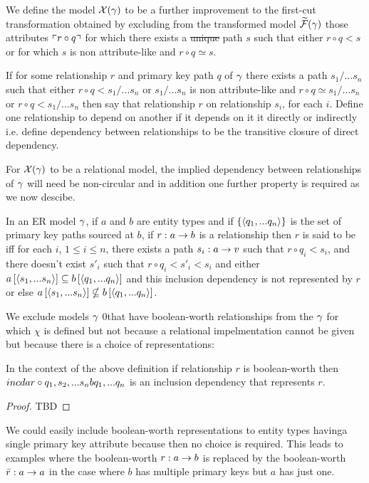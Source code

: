 We define the model $\mathcal{X}(\gamma)$ to be a further improvement to the first-cut transformation obtained by excluding  from  the transformed model $\mathcal{\widetilde{F}}(\gamma)$ those attributes $\left\ulcorner r \circ q\right\urcorner$ for which there exists a \sout{unique}  path $s$ such that  either  $r \circ q < s$ or for which $s$ is non attribute-like and $r \circ q \simeq s$. 

\begin{definition}
If for some relationship $r$ and primary key path $q$ of $\gamma$ there exists a  path $s_1/...s_n$ such that either   $r \circ q < s_1/...s_n$ or $s_1/...s_n$ is non attribute-like and $r \circ q \simeq s_1/...s_n$ or $r \circ q < s_1/...s_n$ then say that relationship $r$  on relationship $s_i$,
for each $i$. Define one relationship to depend on another if it depends on it it directly or indirectly i.e. define dependency between relationships to be the transitive closure of direct dependency.
\end{definition}

For $\mathcal{X}(\gamma)$ to be a relational model, the implied dependency between relationships of $\gamma$ will need be non-circular
and in addition one further property is required as we now descibe.


\begin{definition}
In an  ER model $\gamma$, if $a$ and $b$ are entity types and if $\left\{\langle q_1,...q_n\rangle\right\}$ is the set of primary key paths sourced at $b$, if $r: a \rightarrow b$ is a relationship then $r$ is said to be  
iff for each $i$, $1 \leq i \leq n$, there exists a path $s_i: a \rightarrow v$ such that $r \circ q_i < s_i$,
and there doesn't exist $s'_i$ such that $r \circ q_i < s'_i <s_i$ and  either
$a\left[\langle s_1,...s_n\rangle\right]\subseteq b\left[\langle q_1,...q_n\rangle\right]$ and this inclusion dependency is not represented by
$r$ or else $a\left[\langle s_1,...s_n\rangle\right]\nsubseteq b\left[\langle q_1,...q_n\rangle\right]$.
\end{definition}

We exclude models $\gamma$ 0that have boolean-worth relationships from the $\gamma$ for which $\chi$ is defined but not because a relational impelmentation cannot be given but because there is a choice of representations: 
\begin{lemma}
In the context of the above definition if relationship $r$ is boolean-worth
then $incd{a}{r \circ q_1,s_2,...s_n}{b}{q_1,...q_n}$ is an inclusion dependency that represents $r$. 
\end{lemma}
\begin{proof}
TBD
\end{proof}
We could easily include boolean-worth representations to entity types havinga single primary key attribute because then no choice is required.
This leads to examples where the boolean-worth $r: a \rightarrow b$ is replaced by the boolean-worth $\bar{r}: a \rightarrow a$ in the case where $b$ has multiple primary keys but $a$ has just one.  


